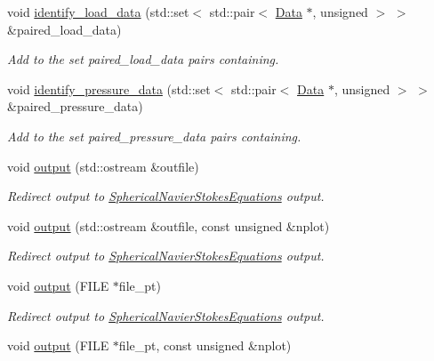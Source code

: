 \begin{DoxyCompactItemize}
void \hyperlink{classoomph_1_1QSphericalCrouzeixRaviartElement_a3ef0fa0d09e3a9e495f348801723d549}{identify\+\_\+load\+\_\+data} (std\+::set$<$ std\+::pair$<$ \hyperlink{classoomph_1_1Data}{Data} $\ast$, unsigned $>$ $>$ \&paired\+\_\+load\+\_\+data)
\begin{DoxyCompactList}\small\item\em Add to the set {\ttfamily paired\+\_\+load\+\_\+data} pairs containing. \end{DoxyCompactList}\item 
void \hyperlink{classoomph_1_1QSphericalCrouzeixRaviartElement_a1fc00abb3eec401fe649f920267bc7f0}{identify\+\_\+pressure\+\_\+data} (std\+::set$<$ std\+::pair$<$ \hyperlink{classoomph_1_1Data}{Data} $\ast$, unsigned $>$ $>$ \&paired\+\_\+pressure\+\_\+data)
\begin{DoxyCompactList}\small\item\em Add to the set {\ttfamily paired\+\_\+pressure\+\_\+data} pairs containing. \end{DoxyCompactList}\item 
void \hyperlink{classoomph_1_1QSphericalCrouzeixRaviartElement_a2e829acc8cb74c743a661b63fb1aa618}{output} (std\+::ostream \&outfile)
\begin{DoxyCompactList}\small\item\em Redirect output to \hyperlink{classoomph_1_1SphericalNavierStokesEquations}{Spherical\+Navier\+Stokes\+Equations} output. \end{DoxyCompactList}\item 
void \hyperlink{classoomph_1_1QSphericalCrouzeixRaviartElement_a23d3c82c7dbb8c220b433d2836707136}{output} (std\+::ostream \&outfile, const unsigned \&nplot)
\begin{DoxyCompactList}\small\item\em Redirect output to \hyperlink{classoomph_1_1SphericalNavierStokesEquations}{Spherical\+Navier\+Stokes\+Equations} output. \end{DoxyCompactList}\item 
void \hyperlink{classoomph_1_1QSphericalCrouzeixRaviartElement_a885098531e6431711647b581817af3c5}{output} (F\+I\+LE $\ast$file\+\_\+pt)
\begin{DoxyCompactList}\small\item\em Redirect output to \hyperlink{classoomph_1_1SphericalNavierStokesEquations}{Spherical\+Navier\+Stokes\+Equations} output. \end{DoxyCompactList}\item 
void \hyperlink{classoomph_1_1QSphericalCrouzeixRaviartElement_a46b94f33217c9d82921055347255b4b5}{output} (F\+I\+LE $\ast$file\+\_\+pt, const unsigned \&nplot)

\end{DoxyCompactItemize}
